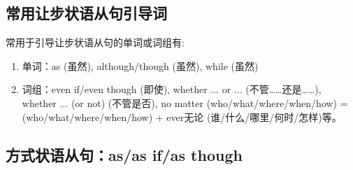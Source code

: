 \subsection{常用让步状语从句引导词}

常用于引导让步状语从句的单词或词组有:
\begin{enumerate}
  \item 单词：as (虽然), although/though (虽然), while (虽然)
  \item 词组：even if/even though (即使), whether \(\ldots\) or \(\ldots\) (不管……还是……), whether \(\ldots\) (or not) (不管是否),
        no matter (who/what/where/when/how) = (who/what/where/when/how) + ever无论 (谁/什么/哪里/何时/怎样)等。
\end{enumerate}

\subsection{方式状语从句：as/as if/as though}


